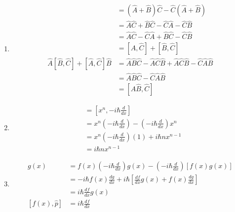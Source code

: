 \documentclass{article}
\begin{document}
\begin{enumerate}
  \item

        \begin{align*}
          [\hat{A} + \hat{B}, \hat{C}]                            & = (\hat{A} + \hat{B}) \hat{C} - \hat{C} (\hat{A} + \hat{B})                                             \\
                                                                  & = \hat{A} \hat{C} + \hat{B} \hat{C} - \hat{C} \hat{A} - \hat{C} \hat{B}                                 \\
                                                                  & = \hat{A} \hat{C} - \hat{C} \hat{A} + \hat{B} \hat{C} - \hat{C} \hat{B}                                 \\
                                                                  & = [\hat{A}, \hat{C}] + [\hat{B}, \hat{C}]                                                               \\
          \hat{A} [\hat{B}, \hat{C}] + [\hat{A}, \hat{C}] \hat{B} & = \hat{A} \hat{B} \hat{C} - \hat{A} \hat{C} \hat{B} + \hat{A} \hat{C} \hat{B} - \hat{C} \hat{A} \hat{B} \\
                                                                  & = \hat{A} \hat{B} \hat{C} - \hat{C} \hat{A} \hat{B}                                                     \\
                                                                  & = [\hat{A} \hat{B}, \hat{C}]
        \end{align*}

  \item

        \begin{align*}
          [x^n, \hat{p}] & = \left[ x^n, -i \hbar \frac{d}{d x} \right]                                            \\
                         & = x^n \left( -i \hbar \frac{d}{d x} \right) - \left( -i \hbar \frac{d}{d x} \right) x^n \\
                         & = x^n \left( -i \hbar \frac{d}{d x} \right) (1) + i \hbar n x^{n - 1}                   \\
                         & = i \hbar n x^{n - 1}
        \end{align*}

  \item

        \begin{align*}
          [f(x), \hat{p}] g(x) & = f(x) \left( -i \hbar \frac{d}{d x} \right) g(x) - \left( -i \hbar \frac{d}{d x} \right) [f(x) g(x)] \\
                               & = -i \hbar f(x) \frac{d g}{d x} + i \hbar \left[ \frac{d f}{d x} g(x) + f(x) \frac{d g}{d x} \right]  \\
                               & = i \hbar \frac{d f}{d x} g(x)                                                                        \\
          [f(x), \hat{p}]      & = i \hbar \frac{d f}{d x}
        \end{align*}


\end{enumerate}
\end{document}
